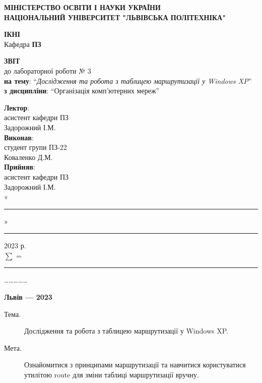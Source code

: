\documentclass{article}
\newcommand\subject{Організація комп’ютерних мереж}
\newcommand\lecturer{асистент кафедри ПЗ \\ Задорожний І.М.}
\newcommand\teacher{асистент кафедри ПЗ \\ Задорожний І.М.}
\newcommand\mygroup{ПЗ-22}
\newcommand\lab{3}
\newcommand\theme{Дослідження та робота з таблицею маршрутизації у Windows XP}
\newcommand\purpose{Ознайомитися з принципами маршрутизації та навчитися користуватися утилітою route для зміни таблиці маршрутизації вручну}
\begin{document}
\begin{normalsize}
	\begin{titlepage}
		\thispagestyle{empty}
		\begin{center}
			\textbf{МІНІСТЕРСТВО ОСВІТИ І НАУКИ УКРАЇНИ\\
				НАЦІОНАЛЬНИЙ УНІВЕРСИТЕТ "ЛЬВІВСЬКА ПОЛІТЕХНІКА"}
		\end{center}
		\begin{flushright}
			\textbf{ІКНІ}\\
			Кафедра \textbf{ПЗ}
		\end{flushright}
		\vspace{200pt}
		\begin{center}
			\textbf{ЗВІТ}\\
			\vspace{10pt}
			до лабораторної роботи № \lab\\
			\textbf{на тему}: “\textit{\theme}”\\
			\textbf{з дисципліни}: “\subject”
		\end{center}
		\vspace{112pt}
		\begin{flushright}
			
			\textbf{Лектор}:\\
			\lecturer\\
			\vspace{28pt}
			\textbf{Виконав}:\\
			
			студент групи \mygroup\\
			Коваленко Д.М.\\
			\vspace{28pt}
			\textbf{Прийняв}:\\
			
			\teacher\\
			
			\vspace{28pt}
			«\rule{1cm}{0.15mm}» \rule{1.5cm}{0.15mm} 2023 р.\\
			$\sum$ = \rule{1cm}{0.15mm}……………\\
			
		\end{flushright}
		\vspace{\fill}
		\begin{center}
			\textbf{Львів — 2023}
		\end{center}
	\end{titlepage}
		
	\begin{description}
		\item[Тема.] \theme.
		\item[Мета.] \purpose.
	\end{description}


\end{normalsize}
\end{document}
